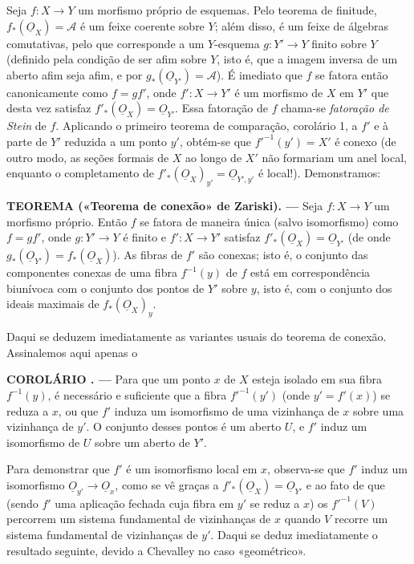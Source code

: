 \documentclass[11pt,twoside,openany]{book}
\numberwithin{equation}{section}
\newcommand{\src}[1]{%
  \phantomsection\hypertarget{src:#1}{}%
  \marginpar{\raggedleft\footnotesize\sffamily #1}%
}
\newcommand{\Osh}{\underline{O}}
\theoremstyle{plain}
\theoremstyle{definition}
\theoremstyle{remark}
\newcommand{\result}[2]{%
  \par\medskip\noindent\textbf{#1%
  \if\relax\detokenize{#2}\relax\else\space#2\fi. ---}\enspace
}
\newcommand{\FgaUnitKey}{frontmatter}
\renewcommand{\src}[1]{%
  \phantomsection\hypertarget{src:\FgaUnitKey:#1}{}%
  \marginpar{\raggedleft\footnotesize\sffamily #1}%
}
\begin{document}
Seja $f:X\longrightarrow Y$ um morfismo próprio de esquemas. Pelo teorema de
finitude, $f_*(\Osh_X)=\mathcal A$ é um feixe coerente sobre $Y$; além disso, é um
feixe de álgebras comutativas, pelo que corresponde a um $Y$-esquema
$g:Y'\longrightarrow Y$ finito sobre $Y$ (definido pela condição de ser afim
sobre $Y$, isto é, que a imagem inversa de um aberto afim seja afim, e por
$g_*(\Osh_{Y'})=\mathcal A$). É imediato que $f$ se fatora então
canonicamente como $f=gf'$, onde $f':X\longrightarrow Y'$ é um morfismo de
$X$ em $Y'$ que desta vez satisfaz $f'_*(\Osh_X)=\Osh_{Y'}$. Essa fatoração
de $f$ chama-se \emph{fatoração de Stein} de $f$. Aplicando o primeiro
teorema de comparação, corolário 1, a $f'$ e à parte de $Y'$ reduzida a um
ponto $y'$, obtém-se que $f'^{-1}(y')=X'$ é conexo (de outro modo, as
seções formais de $X$ ao longo de $X'$ não formariam um anel local,
enquanto o completamento de
$f'_*(\Osh_X)_{y'}=\Osh_{Y',y'}$ é local!). Demonstramos:

\result{TEOREMA}{5 («Teorema de conexão» de Zariski)} Seja
$f:X\longrightarrow Y$ um morfismo próprio. Então $f$ se fatora de maneira
única (salvo isomorfismo) como $f=gf'$, onde $g:Y'\longrightarrow Y$ é finito
e $f':X\longrightarrow Y'$ satisfaz $f'_*(\Osh_X)=\Osh_{Y'}$ (de onde
$g_*(\Osh_{Y'})=f_*(\Osh_X)$). As fibras de $f'$ são conexas; isto é, o
conjunto das componentes conexas de uma fibra $f^{-1}(y)$ de $f$ está em
correspondência biunívoca com o conjunto dos pontos de $Y'$ sobre $y$, isto
é, com o conjunto dos ideais maximais de $f_*(\Osh_X)_y$.

Daqui se deduzem imediatamente as variantes usuais do teorema de
conexão. Assinalemos aqui apenas o

\src{200}
\result{COROLÁRIO}{1} Para que um ponto $x$ de $X$ esteja isolado em sua fibra
$f^{-1}(y)$, é necessário e suficiente que a fibra $f'^{-1}(y')$ (onde
$y'=f'(x)$) se reduza a $x$, ou que $f'$ induza um isomorfismo de uma
vizinhança de $x$ sobre uma vizinhança de $y'$. O conjunto desses pontos é um
aberto $U$, e $f'$ induz um isomorfismo de $U$ sobre um aberto de $Y'$.

Para demonstrar que $f'$ é um isomorfismo local em $x$, observa-se que $f'$
induz um isomorfismo $\Osh_{y'}\longrightarrow\Osh_x$, como se vê graças a
$f'_*(\Osh_X)=\Osh_{Y'}$ e ao fato de que (sendo $f'$ uma aplicação fechada
cuja fibra em $y'$ se reduz a $x$) os $f'^{-1}(V)$ percorrem um sistema
fundamental de vizinhanças de $x$ quando $V$ recorre um sistema fundamental de
vizinhanças de $y'$. Daqui se deduz imediatamente o resultado seguinte, devido a
Chevalley no caso «geométrico».
\end{document}
